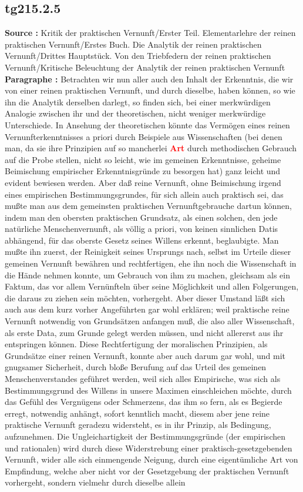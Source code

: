 \documentclass[a4paper,12pt,twoside]{book}
\newcommand{\match}[1]{\textcolor{red}{\textbf{#1}}}
\begin{document}
	\subsection*{tg215.2.5} 
	\textbf{Source : }Kritik der praktischen Vernunft/Erster Teil. Elementarlehre der reinen praktischen Vernunft/Erstes Buch. Die Analytik der reinen praktischen Vernunft/Drittes Hauptstück. Von den Triebfedern der reinen praktischen Vernunft/Kritische Beleuchtung der Analytik der reinen praktischen Vernunft\\  
	
	\noindent\textbf{Paragraphe : }Betrachten wir nun aller auch den Inhalt der Erkenntnis, die wir von einer reinen praktischen Vernunft, und durch dieselbe, haben können, so wie ihn die Analytik derselben darlegt, so finden sich, bei einer merkwürdigen Analogie zwischen ihr und der theoretischen, nicht weniger merkwürdige Unterschiede. In Ansehung der theoretischen könnte das Vermögen eines reinen Vernunfterkenntnisses a priori durch Beispiele aus Wissenschaften (bei denen man, da sie ihre Prinzipien auf so mancherlei \match{Art} durch methodischen Gebrauch auf die Probe stellen, nicht so leicht, wie im gemeinen Erkenntnisse, geheime Beimischung empirischer Erkenntnisgründe zu besorgen hat) ganz leicht und evident bewiesen werden. Aber daß reine Vernunft, ohne Beimischung irgend eines empirischen Bestimmungsgrundes, für sich allein auch praktisch sei, das mußte man aus dem gemeinsten praktischen Vernunftgebrauche dartun können, indem man den obersten praktischen Grundsatz, als einen solchen, den jede natürliche Menschenvernunft, als völlig a priori, von keinen sinnlichen Datis abhängend, für das oberste Gesetz seines Willens erkennt, beglaubigte. Man mußte ihn zuerst, der Reinigkeit seines Ursprungs nach, selbst im Urteile dieser gemeinen Vernunft bewähren und rechtfertigen, ehe ihn noch die Wissenschaft in die Hände nehmen konnte, um Gebrauch von ihm zu machen, gleichsam als ein Faktum, das vor allem Vernünfteln über seine Möglichkeit und allen Folgerungen, die daraus zu ziehen sein möchten, vorhergeht. Aber dieser Umstand läßt sich auch aus dem kurz vorher Angeführten gar wohl erklären; weil praktische reine Vernunft notwendig von Grundsätzen anfangen muß, die also aller Wissenschaft, als erste Data, zum Grunde gelegt werden müssen, und nicht allererst aus ihr entspringen können. Diese Rechtfertigung der moralischen Prinzipien, als Grundsätze einer  reinen Vernunft, konnte aber auch darum gar wohl, und mit gnugsamer Sicherheit, durch bloße Berufung auf das Urteil des gemeinen Menschenverstandes geführet werden, weil sich alles Empirische, was sich als Bestimmungsgrund des Willens in unsere Maximen einschleichen möchte, durch das Gefühl des Vergnügens oder Schmerzens, das ihm so fern, als es Begierde erregt, notwendig anhängt, sofort kenntlich macht, diesem aber jene reine praktische Vernunft geradezu widersteht, es in ihr Prinzip, als Bedingung, aufzunehmen. Die Ungleichartigkeit der Bestimmungsgründe (der empirischen und rationalen) wird durch diese Widerstrebung einer praktisch-gesetzgebenden Vernunft, wider alle sich einmengende Neigung, durch eine eigentümliche Art von Empfindung, welche aber nicht vor der Gesetzgebung der praktischen Vernunft vorhergeht, sondern vielmehr durch dieselbe allein 
\end{document}
